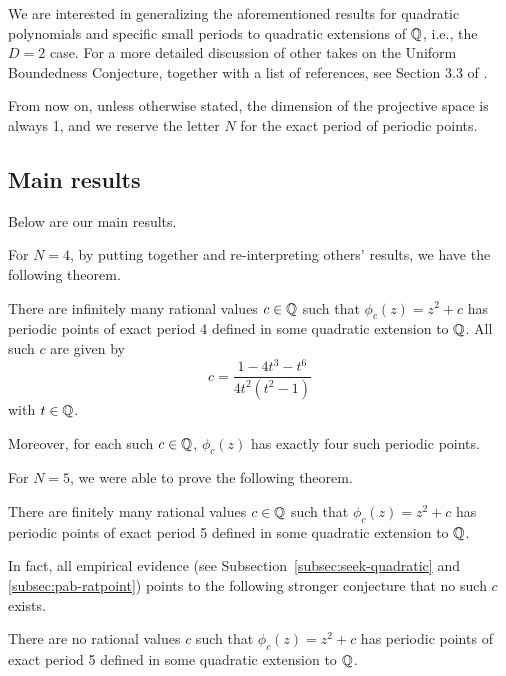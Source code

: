 We are interested in generalizing the aforementioned results for
quadratic polynomials and specific small periods to quadratic
extensions of $\mathbb{Q}$, i.e., the $D = 2$ case. For a more detailed
discussion of other takes on the Uniform Boundedness Conjecture,
together with a list of references, see Section 3.3 of
\cite{MR2316407}.

From now on, unless otherwise stated, the dimension of the projective
space is always 1, and we reserve the letter $N$ for the exact period
of periodic points.

\subsection{Main results}
\label{subsec:results}

Below are our main results.

For $N = 4$, by putting together and re-interpreting others' results,
we have the following theorem.

\begin{theorem}
  \label{th:n=4-infinite}
  There are infinitely many rational values $c \in \mathbb{Q}$ such that
  $\phi_c(z) = z^2 + c$ has periodic points of exact period 4 defined
  in some quadratic extension to $\mathbb{Q}$. All such $c$ are given by
  \[
  c = \frac{1 - 4t^3 - t^6}{4t^2(t^2 - 1)}
  \]
  with $t \in \mathbb{Q}$.

  Moreover, for each such $c \in \mathbb{Q}$, $\phi_c(z)$ has exactly four
  such periodic points.
\end{theorem}

For $N = 5$, we were able to prove the following theorem.

\begin{theorem}
  \label{th:n=5-finite}
  There are finitely many rational values $c \in \mathbb{Q}$ such that
  $\phi_c(z) = z^2 + c$ has periodic points of exact period 5 defined
  in some quadratic extension to $\mathbb{Q}$.
\end{theorem}

In fact, all empirical evidence (see
Subsection~\ref{subsec:seek-quadratic} and \ref{subsec:pab-ratpoint})
points to the following stronger conjecture that no such $c$ exists.

\begin{conjecture}
  \label{cj:n=5-zero}
  There are no rational values $c$ such that $\phi_c(z) = z^2 + c$ has
  periodic points of exact period 5 defined in some quadratic
  extension to $\mathbb{Q}$.
\end{conjecture}

